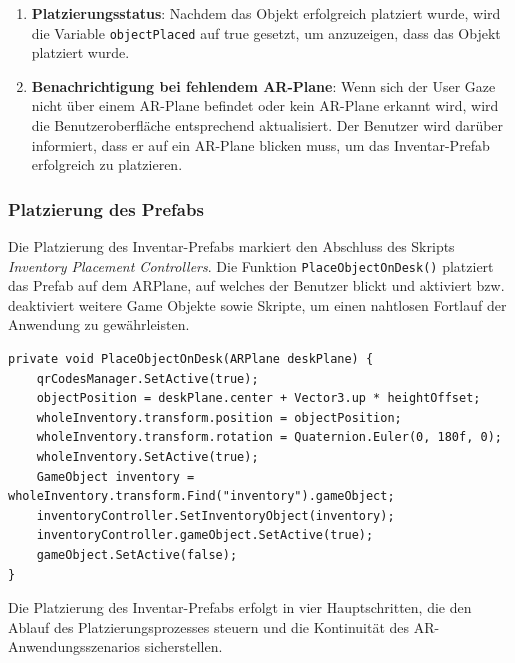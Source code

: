 \begin{enumerate}
    \item \textbf{Platzierungsstatus}: Nachdem das Objekt erfolgreich platziert wurde, wird die Variable \texttt{objectPlaced}
    auf true gesetzt, um anzuzeigen, dass das Objekt platziert wurde.

    \item \textbf{Benachrichtigung bei fehlendem AR-Plane}: Wenn sich der User Gaze nicht über einem AR-Plane befindet
    oder kein AR-Plane erkannt wird, wird die Benutzeroberfläche entsprechend aktualisiert. Der Benutzer wird darüber
    informiert, dass er auf ein AR-Plane blicken muss, um das Inventar-Prefab erfolgreich zu platzieren.
\end{enumerate}

\subsubsection{Platzierung des Prefabs}
Die Platzierung des Inventar-Prefabs markiert den Abschluss des Skripts \textit{Inventory Placement Controllers}. Die
Funktion \texttt{PlaceObjectOnDesk()} platziert das Prefab auf dem ARPlane, auf welches der Benutzer blickt und aktiviert
bzw. deaktiviert weitere Game Objekte sowie Skripte, um einen nahtlosen Fortlauf der Anwendung zu gewährleisten.
\begin{lstlisting}[caption={Funktion zum Platzieren des Inventarobjekts}, label=code:isPOP]
private void PlaceObjectOnDesk(ARPlane deskPlane) {
    qrCodesManager.SetActive(true);
    objectPosition = deskPlane.center + Vector3.up * heightOffset;
    wholeInventory.transform.position = objectPosition;
    wholeInventory.transform.rotation = Quaternion.Euler(0, 180f, 0);
    wholeInventory.SetActive(true);
    GameObject inventory = wholeInventory.transform.Find("inventory").gameObject;
    inventoryController.SetInventoryObject(inventory);
    inventoryController.gameObject.SetActive(true);
    gameObject.SetActive(false);
}
\end{lstlisting}

Die Platzierung des Inventar-Prefabs erfolgt in vier Hauptschritten, die den Ablauf des Platzierungsprozesses steuern und
die Kontinuität des AR-Anwendungsszenarios sicherstellen.

